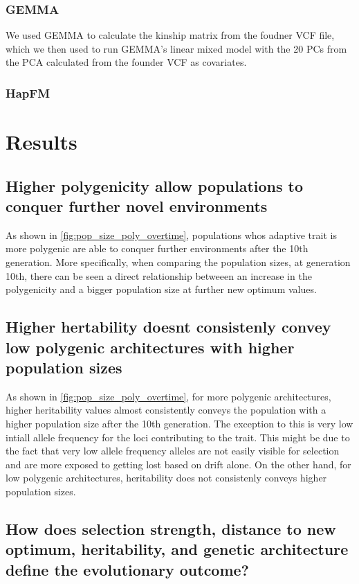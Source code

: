 \documentclass{article}
\begin{document}
\subsubsection{GEMMA}
We used GEMMA to calculate the kinship matrix from the foudner VCF file, which we then used to run GEMMA's linear mixed model with the 20 PCs from the PCA calculated from the founder VCF as covariates. 

\subsubsection{HapFM}

\section{Results}

\subsection{Higher polygenicity allow populations to conquer further novel environments}
As shown in \ref{fig:pop_size_poly_overtime}, populations whos adaptive trait is more polygenic are able to conquer further environments after the 10th generation. More specifically, when comparing the population sizes, at generation 10th, there can be seen a direct relationship betweeen an increase in the polygenicity and a bigger population size at further new optimum values. 

\subsection{Higher hertability doesnt consistenly convey low polygenic architectures with higher population sizes}
As shown in \ref{fig:pop_size_poly_overtime}, for more polygenic architectures, higher heritability values almost consistently conveys the population with a higher population size after the 10th generation. The exception to this is very low intiall allele frequency for the loci contributing to the trait. This might be due to the fact that very low allele frequency alleles are not easily visible for selection and are more exposed to getting lost based on drift alone. On the other hand, for low polygenic architectures, heritability does not consistenly conveys higher population sizes. 

\subsection{How does selection strength, distance to new optimum, heritability, and genetic architecture define the evolutionary outcome?}
\end{document}
